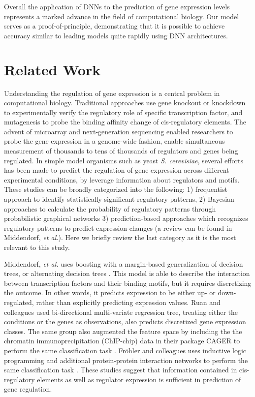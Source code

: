 \documentclass{article}
\begin{document}
Overall the application of DNNs to the prediction of gene expression levels represents a marked advance in the field of computational biology. Our model serves as a proof-of-principle, demonstrating that it is possible to achieve accuracy similar to leading models quite rapidly using DNN architectures.

\section{Related Work}

Understanding the regulation of gene expression is a central problem in computational biology. Traditional approaches use gene knockout or knockdown to experimentally verify the regulatory role of specific transcription factor, and mutagenesis to probe the binding affinity change of cis-regulatory elements. The advent of microarray and next-generation sequencing enabled researchers to probe the gene expression in a genome-wide fashion, enable simultaneous measurement of thousands to tens of thousands of regulators and genes being regulated. In simple model organisms such as yeast \textit{S. cerevisiae}, several efforts has been made to predict the regulation of gene expression across different experimental conditions, by leverage information about regulators and motifs. These studies can be broadly categorized into the following: 1) frequentist approach to identify statistically significant regulatory patterns, 2) Bayesian approaches to calculate the probability of regulatory patterns through probabilistic graphical networks 3) prediction-based approaches which recognizes regulatory patterns to predict expression changes (a review can be found in Middendorf, \textit{et al.}). Here we briefly review the last category as it is the most relevant to this study.

Middendorf, \textit{et al.} uses boosting with a margin-based generalization of decision trees, or alternating decision trees \cite{Middendorf:2004gta}. This model is able to describe the interaction between transcription factors and their binding motifs, but it requires discretizing the outcome. In other words, it predicts expression to be either up- or down-regulated, rather than explicitly predicting expression values. Ruan and colleagues used bi-directional multi-variate regression tree, treating either the conditions or the genes as observations, also predicts discretized gene expression classes\cite{Ruan:2006hl}. The same group also augmented the feature space by including the the chromatin immunoprecipitation (ChIP-chip) data in their package CAGER to perform the same classification task \cite{Ruan:2005dd}. Fröhler and colleagues uses inductive logic programming and additional protein-protein interaction networks to perform the same classification task \cite{Frohler:2007fy}. These studies suggest that information contained in cis-regulatory elements as well as regulator expression is sufficient in prediction of gene regulation.
\end{document}
